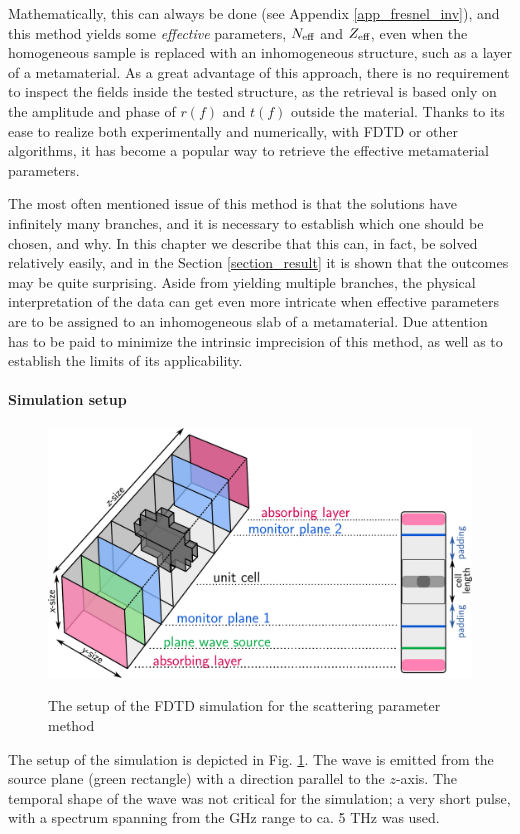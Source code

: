 Mathematically, this can always be done (see Appendix \ref{app_fresnel_inv}), and this method yields some \textit{effective} parameters, $N_{\text{eff} }$ and $Z_{\text{eff} }$, even when the homogeneous sample is replaced with an inhomogeneous structure, such as a layer of a metamaterial. As a great advantage of this approach, there is no requirement to inspect the fields inside the tested structure, as the retrieval is based only on the amplitude and phase of $r(f)$ and $t(f)$ outside the material. Thanks to its ease to realize both experimentally and numerically, with FDTD or other algorithms, %
it has become a popular way to retrieve the effective metamaterial parameters. 

The most often mentioned issue of this method is that the solutions have infinitely many branches, and it is necessary to establish which one should be chosen, and why. In this chapter we describe that this can, in fact, be solved relatively easily, and in the Section \ref{section_result} it is shown that the outcomes may be quite surprising.
Aside from yielding multiple branches, the physical interpretation of the data can get even more intricate when effective parameters are to be assigned to an inhomogeneous slab of a metamaterial. Due attention has to be paid to minimize the intrinsic imprecision of this method, as well as to establish the limits of its applicability. 
\paragraph{Simulation setup} %
\begin{figure}[ht] \centering \caption{The setup of the FDTD simulation for the scattering parameter method} \includegraphics[width=12cm]{img/meep_geometry.pdf}  \label{fg_fdtd_sparam} \end{figure} %
The setup of the simulation is depicted in Fig. \ref{fg_fdtd_sparam}. The wave is emitted from the source plane (green rectangle) with a direction parallel to the $z$-axis. The temporal shape of the wave was not critical for the simulation; a very short pulse, with a spectrum spanning from the GHz range to ca. 5 THz was used. 

